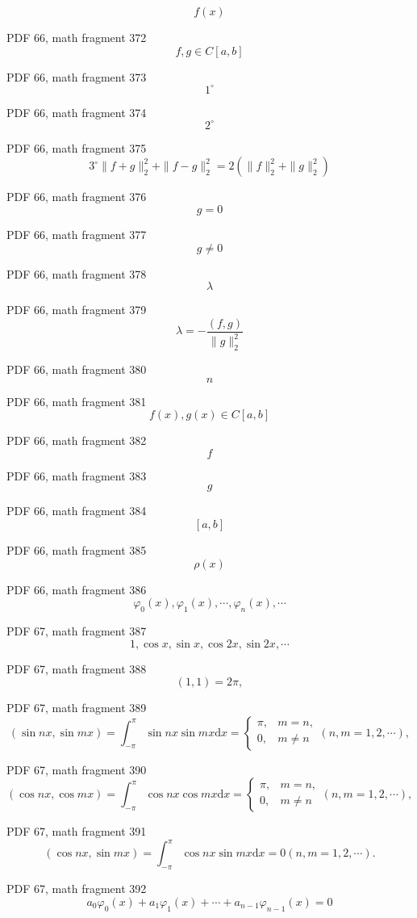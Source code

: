 \documentclass[UTF8,fontset=fandol]{ctexart}
\begin{document}
\[f(x)\]
\par
PDF 66, math fragment 372
\[f, g \in C[a, b]\]
\par
PDF 66, math fragment 373
\[1^{\circ}\]
\par
PDF 66, math fragment 374
\[2^{\circ}\]
\par
PDF 66, math fragment 375
\[3^{\circ} \| f + g \|_{2}^{2} + \| f - g \|_{2}^{2} = 2(\| f \|_{2}^{2} + \| g \|_{2}^{2})\]
\par
PDF 66, math fragment 376
\[g=0\]
\par
PDF 66, math fragment 377
\[g \neq 0\]
\par
PDF 66, math fragment 378
\[\lambda\]
\par
PDF 66, math fragment 379
\[\lambda = -\frac{(f, g)}{\| g \|_{2}^{2}}\]
\par
PDF 66, math fragment 380
\[n\]
\par
PDF 66, math fragment 381
\[f(x), g(x) \in C[a, b]\]
\par
PDF 66, math fragment 382
\[f\]
\par
PDF 66, math fragment 383
\[g\]
\par
PDF 66, math fragment 384
\[[a, b]\]
\par
PDF 66, math fragment 385
\[\rho(x)\]
\par
PDF 66, math fragment 386
\[\varphi_{0}(x), \varphi_{1}(x), \cdots, \varphi_{n}(x), \cdots\]
\par
PDF 67, math fragment 387
\[
1, \cos x, \sin x, \cos 2x, \sin 2x, \cdots
\]
\par
PDF 67, math fragment 388
\[
(1,1) = 2\pi,
\]
\par
PDF 67, math fragment 389
\[
(\sin nx, \sin mx) = \int_{-\pi}^{\pi} \sin nx \sin mx \mathrm{d}x = \begin{cases} \pi, & m=n, \\ 0, & m \neq n \end{cases} (n,m=1,2, \cdots),
\]
\par
PDF 67, math fragment 390
\[
(\cos nx, \cos mx) = \int_{-\pi}^{\pi} \cos nx \cos mx \mathrm{d}x = \begin{cases} \pi, & m=n, \\ 0, & m \neq n \end{cases} (n,m=1,2, \cdots),
\]
\par
PDF 67, math fragment 391
\[
(\cos nx, \sin mx) = \int_{-\pi}^{\pi} \cos nx \sin mx \mathrm{d}x = 0 (n,m=1,2, \cdots).
\]
\par
PDF 67, math fragment 392
\[
a_0 \varphi_0(x) + a_1 \varphi_1(x) + \cdots + a_{n-1} \varphi_{n-1}(x) = 0
\]
\end{document}
